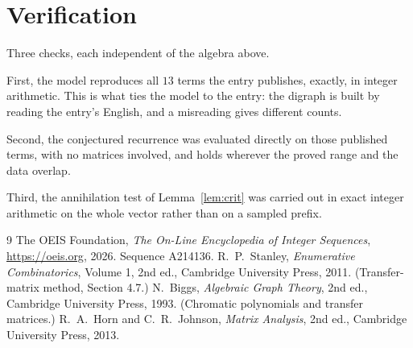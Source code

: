 \documentclass[11pt,a4paper]{article}
\theoremstyle{plain}
\theoremstyle{definition}
\begin{document}
\section{Verification}

Three checks, each independent of the algebra above.

First, the model reproduces all $13$ terms the entry publishes, exactly, in integer
arithmetic. This is what ties the model to the entry: the digraph is built by reading the
entry's English, and a misreading gives different counts.

Second, the conjectured recurrence was evaluated directly on those published terms, with no
matrices involved, and holds wherever the proved range and the data overlap.

Third, the annihilation test of Lemma~\ref{lem:crit} was carried out in exact integer
arithmetic on the whole vector rather than on a sampled prefix.

\begin{thebibliography}{9}
 The OEIS Foundation, \emph{The On-Line Encyclopedia of Integer
Sequences}, \url{https://oeis.org}, 2026. Sequence A214136.
 R.~P.~Stanley, \emph{Enumerative Combinatorics}, Volume 1, 2nd ed.,
Cambridge University Press, 2011. (Transfer-matrix method, Section 4.7.)
 N.~Biggs, \emph{Algebraic Graph Theory}, 2nd ed., Cambridge University
Press, 1993. (Chromatic polynomials and transfer matrices.)
 R.~A.~Horn and C.~R.~Johnson, \emph{Matrix Analysis}, 2nd ed., Cambridge
University Press, 2013.
\end{thebibliography}
\end{document}
